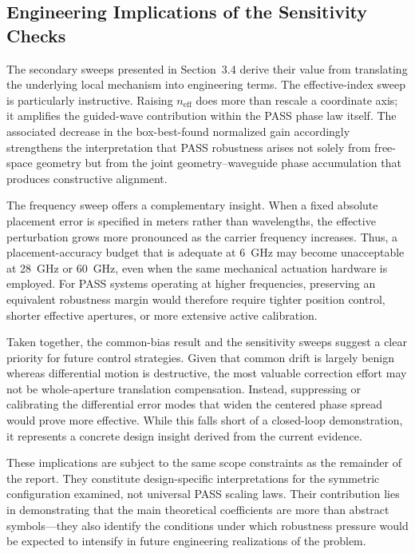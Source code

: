 \subsection{Engineering Implications of the Sensitivity Checks}

The secondary sweeps presented in Section~3.4 derive their value from translating the underlying local mechanism into engineering terms. The effective-index sweep is particularly instructive. Raising \(n_{\mathrm{eff}}\) does more than rescale a coordinate axis; it amplifies the guided-wave contribution within the PASS phase law itself. The associated decrease in the box-best-found normalized gain accordingly strengthens the interpretation that PASS robustness arises not solely from free-space geometry but from the joint geometry–waveguide phase accumulation that produces constructive alignment.

The frequency sweep offers a complementary insight. When a fixed absolute placement error is specified in meters rather than wavelengths, the effective perturbation grows more pronounced as the carrier frequency increases. Thus, a placement-accuracy budget that is adequate at \SI{6}{GHz} may become unacceptable at \SI{28}{GHz} or \SI{60}{GHz}, even when the same mechanical actuation hardware is employed. For PASS systems operating at higher frequencies, preserving an equivalent robustness margin would therefore require tighter position control, shorter effective apertures, or more extensive active calibration.

Taken together, the common-bias result and the sensitivity sweeps suggest a clear priority for future control strategies. Given that common drift is largely benign whereas differential motion is destructive, the most valuable correction effort may not be whole-aperture translation compensation. Instead, suppressing or calibrating the differential error modes that widen the centered phase spread would prove more effective. While this falls short of a closed-loop demonstration, it represents a concrete design insight derived from the current evidence.

These implications are subject to the same scope constraints as the remainder of the report. They constitute design-specific interpretations for the symmetric configuration examined, not universal PASS scaling laws. Their contribution lies in demonstrating that the main theoretical coefficients are more than abstract symbols—they also identify the conditions under which robustness pressure would be expected to intensify in future engineering realizations of the problem.


